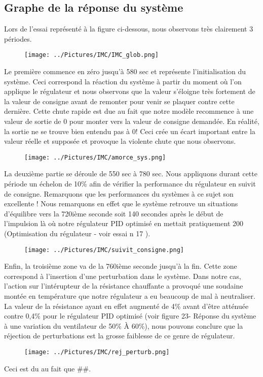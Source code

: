 \subsection{Graphe de la réponse du système}
Lors de l'essai représenté à la figure ci-dessous, nous observons très clairement 3 périodes.
\begin{figure}[H]
\texttt{[image: ../Pictures/IMC/IMC\_glob.png]}
\end{figure}
Le première commence en zéro jusqu'à 580 sec et représente l'initialisation du système. Ceci correspond la réaction du système à partir du moment où l'on applique le régulateur et nous observons que la valeur s'éloigne très fortement de la valeur de consigne avant de remonter pour venir se plaquer contre cette dernière. Cette chute rapide est due au fait que notre modèle recommence à une valeur de sortie de 0 pour monter vers la valeur de consigne demandée. En réalité, la sortie ne se trouve bien entendu pas à 0! Ceci crée un écart important entre la valeur réelle et supposée et provoque la violente chute que nous observons.

\begin{figure}[H]
\texttt{[image: ../Pictures/IMC/amorce\_sys.png]}
\end{figure}
La deuxième partie se déroule de 550 sec à 780 sec. Nous appliquons durant cette période un échelon de 10\% afin de vérifier la performance du régulateur en suivit de consigne. Remarquons que les performances du systèmes à ce sujet son excellente ! Nous remarquons en effet que le système retrouve un situations d'équilibre vers la 720ième seconde soit 140 secondes après le début de l'impulsion là où notre régulateur PID optimisé en mettait pratiquement 200 (Optimisation du régulateur - voir essai n 17 ). 
\begin{figure}[H]
\texttt{[image: ../Pictures/IMC/suivit\_consigne.png]}
\end{figure}
Enfin, la troisième zone va de la 760ième seconde jusqu'à la fin. Cette zone correspond à l'insertion  d'une perturbation dans le système. Dans notre cas, l'action sur l'intérupteur de la résistance chauffante a provoqué une soudaine montée en température que notre régulateur a eu beaucoup de mal à neutraliser. La valeur de la résistance ayant en effet augmenté de 4\% avant d'être atténuée contre 0,4\% pour le régulateur PID optimisé (voir figure 23- Réponse du système à une variation du ventilateur de 50\% À 60\%), nous pouvons conclure que la réjection de perturbations est la grosse faiblesse de ce genre de régulateur. 
\begin{figure}[H]
\texttt{[image: ../Pictures/IMC/rej\_perturb.png]}
\end{figure}
Ceci est du au fait que \#\#.
